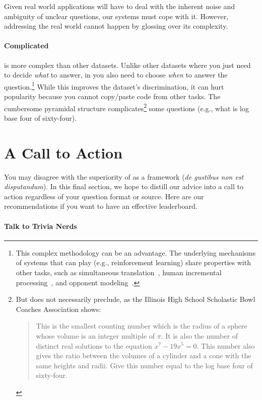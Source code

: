 Given real world applications will have to deal with the inherent noise and ambiguity of unclear questions, our systems must cope with it.
However, addressing the real world cannot happen by glossing over its complexity.


\paragraph{Complicated}

\qb{} is more complex than other datasets.
Unlike other datasets where you just need to decide \emph{what} to
answer, in \qb{} you also need to choose \emph{when} to answer the
question.\footnote{This complex methodology can be an advantage.  The
  underlying mechanisms of systems that can play \qb{} (e.g.,
  reinforcement learning) share properties with other tasks, such as
  simultaneous
  translation~\cite{grissom:he:boyd-graber:morgan-2014,ma-etal-2019-stacl},
  human incremental processing~\cite{levy-08,levy-11}, and opponent
  modeling~\cite{he-16}.}
While this improves the dataset's discrimination, it can hurt
popularity because you cannot copy/paste code from other 
tasks.
The cumbersome pyramidal structure complicates\footnote{But does not
  necessarily preclude, as the Illinois High School
  Scholastic Bowl Coaches Association shows:
\begin{quote}
    This is the smallest counting number which is the radius of a sphere whose volume is an integer multiple of $\pi$. It is also the number of distinct real solutions to the equation $x^7-19x^5=0$. This number also gives the ratio between the volumes of a cylinder and a cone with the same heights and radii. Give this number equal to the log base four of sixty-four.
\end{quote}} some questions (e.g.,
what is log base four of sixty-four).




\section{A Call to Action}
\label{sec:call}


You may disagree with the superiority of \qb{} as a \qa{} framework (\textit{de gustibus non est disputandum}).
In this final section, we hope to distill our advice into a call to action regardless of your question format or source.
Here are our recommendations if you want to have an effective leaderboard.

\paragraph{Talk to Trivia Nerds}

